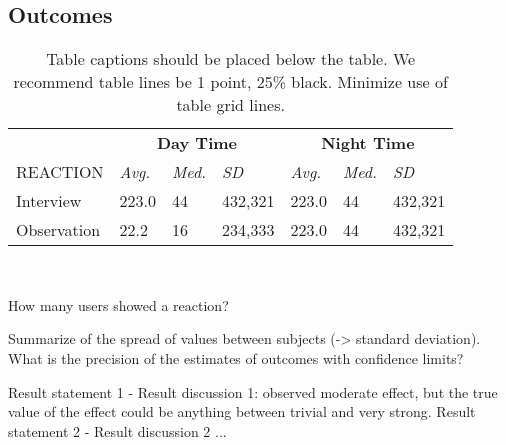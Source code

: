 \subsection{Outcomes}


\begin{table}
  \small
  \centering
  \begin{tabular}{l l l l l l l}
    & \multicolumn{3}{c}{\small{\textbf{Day Time}}} & \multicolumn{3}{c}{\small{\textbf{Night Time}}} \\
               \cmidrule(r){2-7}
    REACTION & {\small \textit{Avg.}} & {\small \textit{Med.}} & {\small \textit{SD}} & 
      {\small \textit{Avg.}} & {\small \textit{Med.}} & {\small \textit{SD}} \\
    \midrule
    Interview & 223.0 & 44 & 432,321 & 223.0 & 44 & 432,321 \\
    Observation & 22.2 & 16 & 234,333 & 223.0 & 44 & 432,321\\
  \end{tabular}
  \caption{Table captions should be placed below the table. We
    recommend table lines be 1 point, 25\% black. Minimize use of
    table grid lines.}~\label{tab:table1}
\end{table}

How many users showed a reaction?


Summarize of the spread of values between subjects (-> standard deviation).
What is the precision of the estimates of outcomes with confidence limits?

Result statement 1 - Result discussion 1: observed moderate effect, but the true value of the effect could be anything between trivial and very strong.
Result statement 2 - Result discussion 2
...
